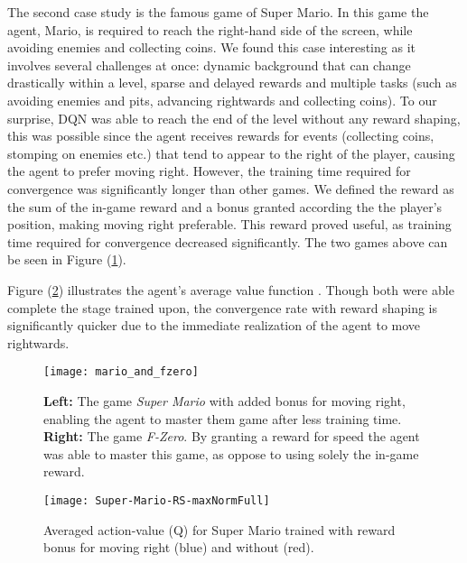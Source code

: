 \documentclass{article}
\begin{document}
The second case study is the famous game of Super Mario. In this game the agent, Mario, is required to reach the right-hand side of the screen, while avoiding enemies and collecting coins. 
We found this case interesting as it involves several challenges at once: dynamic background that can change drastically within a level, sparse and delayed rewards and multiple tasks (such as avoiding enemies and pits, advancing rightwards and collecting coins). 
To our surprise, DQN was able to reach the end of the level without any reward shaping, this was possible since the agent receives rewards for events (collecting coins, stomping on enemies etc.) that tend to appear to the right of the player, causing the agent to prefer moving right. 
However, the training time required for convergence was significantly longer than other games. 
We defined the reward as the sum of the in-game reward and a bonus granted according the the player's position, making moving right preferable. 
This reward proved useful, as training time required for convergence decreased significantly. 
The two games above can be seen in Figure (\ref{fig:mario_and_fzero}).

Figure (\ref{fig:Super-Mario-RS}) illustrates the agent's average value function . Though both were able complete the stage trained upon, the convergence rate with reward shaping is significantly quicker due to the immediate realization of the agent to move rightwards.

\begin{figure}[ht]
\texttt{[image: mario\_and\_fzero]} 
\caption{\textbf{Left:} The game \textit{Super Mario} with added bonus for moving right, enabling the agent to master them game after less training time. \textbf{Right:} The game \textit{F-Zero}. By granting a reward for speed the agent was able to master this game, as oppose to using solely the in-game reward.  }
\label{fig:mario_and_fzero}
\end{figure}


\begin{figure}[ht]
\texttt{[image: Super-Mario-RS-maxNormFull]} 
\caption{Averaged action-value (Q) for Super Mario trained with reward bonus for moving right (blue) and without (red). }
\label{fig:Super-Mario-RS}
\end{figure}
\end{document}
